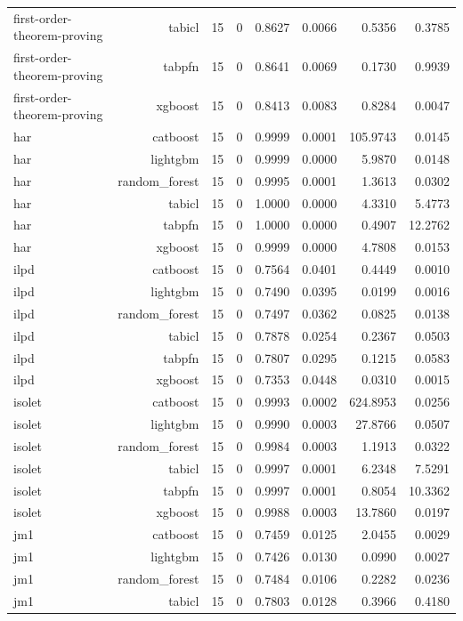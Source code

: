 \begin{table}[htbp]
\begin{tabular}{lrrrrrrr}
first-order-theorem-proving & tabicl & 15 & 0 & 0.8627 & 0.0066 & 0.5356 & 0.3785 \\
first-order-theorem-proving & tabpfn & 15 & 0 & 0.8641 & 0.0069 & 0.1730 & 0.9939 \\
first-order-theorem-proving & xgboost & 15 & 0 & 0.8413 & 0.0083 & 0.8284 & 0.0047 \\
har & catboost & 15 & 0 & 0.9999 & 0.0001 & 105.9743 & 0.0145 \\
har & lightgbm & 15 & 0 & 0.9999 & 0.0000 & 5.9870 & 0.0148 \\
har & random\_forest & 15 & 0 & 0.9995 & 0.0001 & 1.3613 & 0.0302 \\
har & tabicl & 15 & 0 & 1.0000 & 0.0000 & 4.3310 & 5.4773 \\
har & tabpfn & 15 & 0 & 1.0000 & 0.0000 & 0.4907 & 12.2762 \\
har & xgboost & 15 & 0 & 0.9999 & 0.0000 & 4.7808 & 0.0153 \\
ilpd & catboost & 15 & 0 & 0.7564 & 0.0401 & 0.4449 & 0.0010 \\
ilpd & lightgbm & 15 & 0 & 0.7490 & 0.0395 & 0.0199 & 0.0016 \\
ilpd & random\_forest & 15 & 0 & 0.7497 & 0.0362 & 0.0825 & 0.0138 \\
ilpd & tabicl & 15 & 0 & 0.7878 & 0.0254 & 0.2367 & 0.0503 \\
ilpd & tabpfn & 15 & 0 & 0.7807 & 0.0295 & 0.1215 & 0.0583 \\
ilpd & xgboost & 15 & 0 & 0.7353 & 0.0448 & 0.0310 & 0.0015 \\
isolet & catboost & 15 & 0 & 0.9993 & 0.0002 & 624.8953 & 0.0256 \\
isolet & lightgbm & 15 & 0 & 0.9990 & 0.0003 & 27.8766 & 0.0507 \\
isolet & random\_forest & 15 & 0 & 0.9984 & 0.0003 & 1.1913 & 0.0322 \\
isolet & tabicl & 15 & 0 & 0.9997 & 0.0001 & 6.2348 & 7.5291 \\
isolet & tabpfn & 15 & 0 & 0.9997 & 0.0001 & 0.8054 & 10.3362 \\
isolet & xgboost & 15 & 0 & 0.9988 & 0.0003 & 13.7860 & 0.0197 \\
jm1 & catboost & 15 & 0 & 0.7459 & 0.0125 & 2.0455 & 0.0029 \\
jm1 & lightgbm & 15 & 0 & 0.7426 & 0.0130 & 0.0990 & 0.0027 \\
jm1 & random\_forest & 15 & 0 & 0.7484 & 0.0106 & 0.2282 & 0.0236 \\
jm1 & tabicl & 15 & 0 & 0.7803 & 0.0128 & 0.3966 & 0.4180 \\

\end{tabular}
\end{table}
